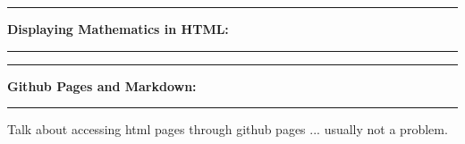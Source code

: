 \documentclass[10pt,fleqn]{article}
\begin{document}
\vskip0.1in\hrule\vskip0.1in \noindent
{\bf Displaying Mathematics in HTML:}
\vskip0.1in\hrule\vskip0.1in \noindent
\vskip0.1in\hrule\vskip0.1in \noindent
{\bf Github Pages and Markdown:}
\vskip0.1in\hrule\vskip0.1in \noindent
Talk about accessing html pages through github pages ... usually not a problem.
\end{document}
